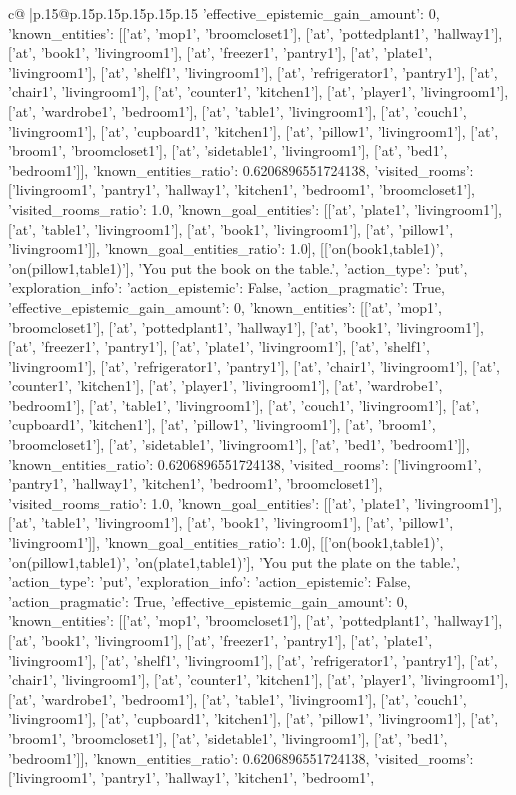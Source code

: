 \documentclass{article}
\begin{document}
{\begin{supertabular}{c@{$\;$}|p{.15\linewidth}@{}p{.15\linewidth}p{.15\linewidth}p{.15\linewidth}p{.15\linewidth}p{.15\linewidth}}
{{{'effective_epistemic_gain_amount': 0, 'known_entities': [['at', 'mop1', 'broomcloset1'], ['at', 'pottedplant1', 'hallway1'], ['at', 'book1', 'livingroom1'], ['at', 'freezer1', 'pantry1'], ['at', 'plate1', 'livingroom1'], ['at', 'shelf1', 'livingroom1'], ['at', 'refrigerator1', 'pantry1'], ['at', 'chair1', 'livingroom1'], ['at', 'counter1', 'kitchen1'], ['at', 'player1', 'livingroom1'], ['at', 'wardrobe1', 'bedroom1'], ['at', 'table1', 'livingroom1'], ['at', 'couch1', 'livingroom1'], ['at', 'cupboard1', 'kitchen1'], ['at', 'pillow1', 'livingroom1'], ['at', 'broom1', 'broomcloset1'], ['at', 'sidetable1', 'livingroom1'], ['at', 'bed1', 'bedroom1']], 'known_entities_ratio': 0.6206896551724138, 'visited_rooms': ['livingroom1', 'pantry1', 'hallway1', 'kitchen1', 'bedroom1', 'broomcloset1'], 'visited_rooms_ratio': 1.0, 'known_goal_entities': [['at', 'plate1', 'livingroom1'], ['at', 'table1', 'livingroom1'], ['at', 'book1', 'livingroom1'], ['at', 'pillow1', 'livingroom1']], 'known_goal_entities_ratio': 1.0}}], [['on(book1,table1)', 'on(pillow1,table1)'], 'You put the book on the table.', {'action_type': 'put', 'exploration_info': {'action_epistemic': False, 'action_pragmatic': True, 'effective_epistemic_gain_amount': 0, 'known_entities': [['at', 'mop1', 'broomcloset1'], ['at', 'pottedplant1', 'hallway1'], ['at', 'book1', 'livingroom1'], ['at', 'freezer1', 'pantry1'], ['at', 'plate1', 'livingroom1'], ['at', 'shelf1', 'livingroom1'], ['at', 'refrigerator1', 'pantry1'], ['at', 'chair1', 'livingroom1'], ['at', 'counter1', 'kitchen1'], ['at', 'player1', 'livingroom1'], ['at', 'wardrobe1', 'bedroom1'], ['at', 'table1', 'livingroom1'], ['at', 'couch1', 'livingroom1'], ['at', 'cupboard1', 'kitchen1'], ['at', 'pillow1', 'livingroom1'], ['at', 'broom1', 'broomcloset1'], ['at', 'sidetable1', 'livingroom1'], ['at', 'bed1', 'bedroom1']], 'known_entities_ratio': 0.6206896551724138, 'visited_rooms': ['livingroom1', 'pantry1', 'hallway1', 'kitchen1', 'bedroom1', 'broomcloset1'], 'visited_rooms_ratio': 1.0, 'known_goal_entities': [['at', 'plate1', 'livingroom1'], ['at', 'table1', 'livingroom1'], ['at', 'book1', 'livingroom1'], ['at', 'pillow1', 'livingroom1']], 'known_goal_entities_ratio': 1.0}}], [['on(book1,table1)', 'on(pillow1,table1)', 'on(plate1,table1)'], 'You put the plate on the table.', {'action_type': 'put', 'exploration_info': {'action_epistemic': False, 'action_pragmatic': True, 'effective_epistemic_gain_amount': 0, 'known_entities': [['at', 'mop1', 'broomcloset1'], ['at', 'pottedplant1', 'hallway1'], ['at', 'book1', 'livingroom1'], ['at', 'freezer1', 'pantry1'], ['at', 'plate1', 'livingroom1'], ['at', 'shelf1', 'livingroom1'], ['at', 'refrigerator1', 'pantry1'], ['at', 'chair1', 'livingroom1'], ['at', 'counter1', 'kitchen1'], ['at', 'player1', 'livingroom1'], ['at', 'wardrobe1', 'bedroom1'], ['at', 'table1', 'livingroom1'], ['at', 'couch1', 'livingroom1'], ['at', 'cupboard1', 'kitchen1'], ['at', 'pillow1', 'livingroom1'], ['at', 'broom1', 'broomcloset1'], ['at', 'sidetable1', 'livingroom1'], ['at', 'bed1', 'bedroom1']], 'known_entities_ratio': 0.6206896551724138, 'visited_rooms': ['livingroom1', 'pantry1', 'hallway1', 'kitchen1', 'bedroom1', }}}
\end{supertabular}}
\end{document}
